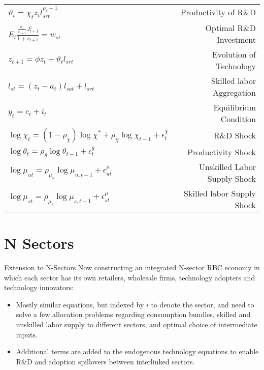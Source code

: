 \documentclass[compress,xcolor=dvipsnames]{beamer}
\newenvironment{noheadline}{
    \setbeamertemplate{headline}{}
    \addtobeamertemplate{frametitle}{\vspace*{-0.9\baselineskip}}{}
}{}
\begin{document}
\begin{frame}
\begin{table}[h!]
{\begin{tabular}{lr}
$\vartheta_t =  \chi_t z_t l_{srt}^{\rho_z-1}$ & Productivity of R\&D \\
$E_t \frac{\frac{\vartheta_{t}}{z_{t+1}} J^z_{t+1}}{1+r_{t+1}} =w_{st}$ & Optimal R\&D Investment\\
$z_{t+1}=\phi z_t + \vartheta_tl_{srt}$ & Evolution of Technology \\
$l_{st} = (z_t-a_t) l_{sat} + l_{srt}$ & Skilled labor Aggregation \\
$y_t=c_t+i_t$ & Equilibrium Condition \\
$\log \chi_t = (1-\rho_\chi)\log \chi^* +\rho_\chi \log \chi_{t-1}+\epsilon_t^\chi$ & R\&D Shock \\
$\log \theta_t= \rho_\theta \log \theta_{t-1}+\epsilon_t^\theta$ & Productivity Shock \\ 
$\log \mu_{ut} = \rho_{\mu_u} \log \mu_{u,t-1} +\epsilon_{ut}^\mu$ & Unskilled Labor Supply Shock \\ 
$\log \mu_{st} = \rho_{\mu_s} \log \mu_{s,t-1} +\epsilon_{st}^\mu$ & Skilled labor Supply Shock \\ \bottomrule
\end{tabular}
}
\end{table}
\end{frame}


\section{N Sectors}

\begin{noheadline}
\begin{frame}{Extension to N-Sectors}
Now constructing an integrated N-sector RBC economy in which each sector has its own
retailers, wholesale firms, technology adopters and technology innovators: \vspace{3mm}
\begin{itemize}
\item Mostly similar equations, but indexed by $i$ to denote the sector, and need to solve a few allocation problems regarding consumption bundles, skilled and unskilled labor supply to different sectors, and optimal choice of intermediate inputs.
\item Additional terms are added to the endogenous technology equations to enable R\&D and adoption spillovers between interlinked sectors. 
\end{itemize}
\end{frame}
\end{noheadline}
\end{document}
